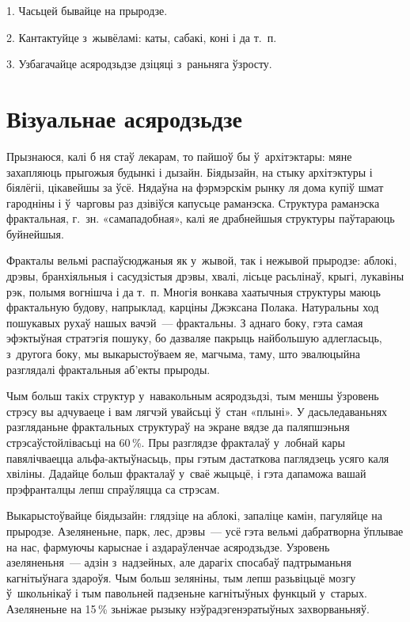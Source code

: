 1. Часьцей бывайце на прыродзе.

2. Кантактуйце з~жывёламі: каты, сабакі, коні і да т.~п.

3. Узбагачайце асяродзьдзе дзіцяці з~раньняга ўзросту.


\section{Візуальнае асяродзьдзе}

Прызнаюся, калі б ня стаў лекарам, то пайшоў бы ў~архітэктары: мяне захапляюць прыгожыя будынкі і дызайн. Біядызайн, на стыку архітэктуры і біялёгіі, цікавейшы за ўсё. Нядаўна на фэрмэрскім рынку ля дома купіў шмат гародніны і ў~чарговы раз дзівіўся капусьце раманэска. Структура раманэска фрактальная, г.~зн. «самападобная», калі яе драбнейшыя структуры паўтараюць буйнейшыя.

Фракталы вельмі распаўсюджаныя як у~жывой, так і нежывой прыродзе: аблокі, дрэвы, бранхіяльныя і сасудзістыя дрэвы, хвалі, лісьце расьлінаў, крыгі, лукавіны рэк, полымя вогнішча і да т.~п. Многія вонкава хаатычныя структуры маюць фрактальную будову, напрыклад, карціны Джэксана Полака. Натуральны ход пошукавых рухаў нашых вачэй~--- фрактальны. З аднаго боку, гэта самая эфэктыўная стратэгія пошуку, бо дазваляе пакрыць найбольшую адлегласьць, з~другога боку, мы выкарыстоўваем яе, магчыма, таму, што эвалюцыйна разглядалі фрактальныя аб'екты прыроды. 

Чым больш такіх структур у~навакольным асяродзьдзі, тым меншы ўзровень стрэсу вы адчуваеце і вам лягчэй увайсьці ў~стан «плыні». У дасьледаваньнях разгляданьне фрактальных структураў на экране вядзе да паляпшэньня стрэсаўстойлівасьці на 60\,\%. Пры разглядзе фракталаў у~лобнай кары павялічваецца альфа-актыўнасьць, пры гэтым дастаткова паглядзець усяго каля хвіліны. Дадайце больш фракталаў у~сваё жыцьцё, і гэта дапаможа вашай прэфранталцы лепш спраўляцца са стрэсам.

Выкарыстоўвайце біядызайн: глядзіце на аблокі, запаліце камін, пагуляйце на прыродзе. Азеляненьне, парк, лес, дрэвы~--- усё гэта вельмі дабратворна ўплывае на нас, фармуючы карыснае і аздараўленчае асяродзьдзе. Узровень азеляненьня~--- адзін з~надзейных, але дарагіх спосабаў падтрыманьня кагнітыўнага здароўя. Чым больш зеляніны, тым лепш разьвіцьцё мозгу ў~школьнікаў і тым павольней падзеньне кагнітыўных функцый у~старых. Азеляненьне на 15\,\% зьніжае рызыку нэўрадэгенэратыўных захворваньняў.


